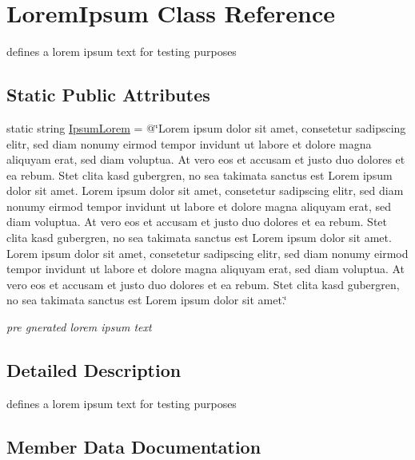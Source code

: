 \hypertarget{class_lorem_ipsum}{}\section{Lorem\+Ipsum Class Reference}
\label{class_lorem_ipsum}


defines a lorem ipsum text for testing purposes  


\subsection*{Static Public Attributes}
\begin{DoxyCompactItemize}
\item 
static string \mbox{\hyperlink{class_lorem_ipsum_a1a11ef50e3a5b94928207b15b4ce6fa6}{Ipsum\+Lorem}} = @\char`\"{}Lorem ipsum dolor sit amet, consetetur sadipscing elitr, sed diam nonumy eirmod tempor invidunt ut labore et dolore magna aliquyam erat, sed diam voluptua. At vero eos et accusam et justo duo dolores et ea rebum. Stet clita kasd gubergren, no sea takimata sanctus est Lorem ipsum dolor sit amet. Lorem ipsum dolor sit amet, consetetur sadipscing elitr, sed diam nonumy eirmod tempor invidunt ut labore et dolore magna aliquyam erat, sed diam voluptua. At vero eos et accusam et justo duo dolores et ea rebum. Stet clita kasd gubergren, no sea takimata sanctus est Lorem ipsum dolor sit amet. Lorem ipsum dolor sit amet, consetetur sadipscing elitr, sed diam nonumy eirmod tempor invidunt ut labore et dolore magna aliquyam erat, sed diam voluptua. At vero eos et accusam et justo duo dolores et ea rebum. Stet clita kasd gubergren, no sea takimata sanctus est Lorem ipsum dolor sit amet.\char`\"{}
\begin{DoxyCompactList}\small\item\em pre gnerated lorem ipsum text \end{DoxyCompactList}\end{DoxyCompactItemize}


\subsection{Detailed Description}
defines a lorem ipsum text for testing purposes 



\subsection{Member Data Documentation}
\mbox{\label{class_lorem_ipsum_a1a11ef50e3a5b94928207b15b4ce6fa6}} 
